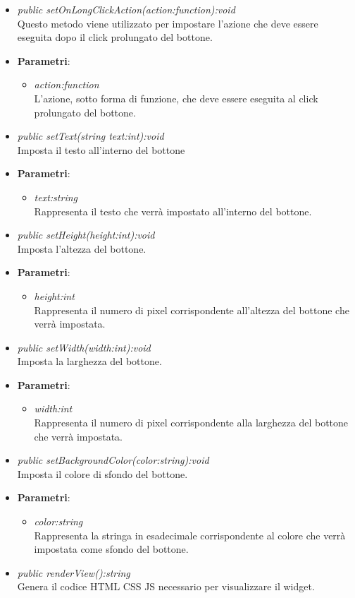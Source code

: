 \begin{itemize}
\begin{itemize}
{\begin{itemize}
		\end{itemize}}
	\item \textit{public setOnLongClickAction(action:function):void}\\
		Questo metodo viene utilizzato per impostare l'azione che deve essere eseguita dopo il click prolungato del bottone.
		\item{\textbf{Parametri}: \begin{itemize}
		\item \textit{action:function}\\
		L'azione, sotto forma di funzione, che deve essere eseguita al click prolungato del bottone.
		\end{itemize}}
	\item \textit{public setText(string text:int):void}\\
	Imposta il testo all'interno del bottone
		\item{\textbf{Parametri}: \begin{itemize}
		\item \textit{text:string}\\
		Rappresenta il testo che verrà impostato all'interno del bottone.
		\end{itemize}}
	\item \textit{public setHeight(height:int):void}\\
	Imposta l'altezza del bottone.
		\item{\textbf{Parametri}: \begin{itemize}
		\item \textit{height:int}\\
		Rappresenta il numero di pixel corrispondente all'altezza del bottone che verrà impostata.
		\end{itemize}}
	\item \textit{public setWidth(width:int):void}\\
	Imposta la larghezza del bottone.
		\item{\textbf{Parametri}: \begin{itemize}
		\item \textit{width:int}\\
		Rappresenta il numero di pixel corrispondente alla larghezza del bottone che verrà impostata.
		\end{itemize}}
	\item \textit{public setBackgroundColor(color:string):void}\\
	Imposta il colore di sfondo del bottone.
		\item{\textbf{Parametri}: \begin{itemize}
		\item \textit{color:string}\\
		Rappresenta la stringa in esadecimale corrispondente al colore che verrà impostata come sfondo del bottone.
		\end{itemize}}
	\item \textit{public renderView():string}\\
	Genera il codice HTML CSS JS necessario per visualizzare il widget.
	\end{itemize}
\end{itemize}

